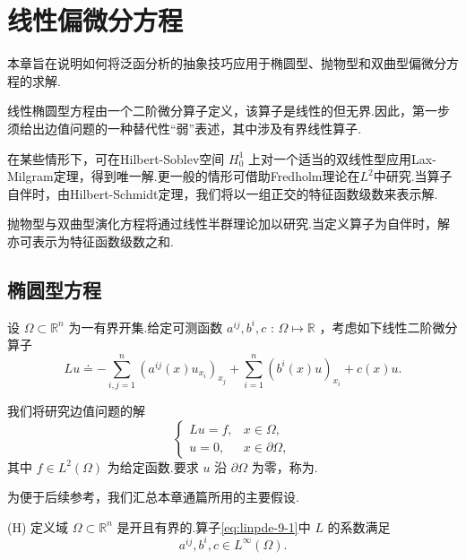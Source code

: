 \chapter{线性偏微分方程}


\vspace{-2em}
本章旨在说明如何将泛函分析的抽象技巧应用于椭圆型、抛物型和双曲型偏微分方程的求解.

线性椭圆型方程由一个二阶微分算子定义，该算子是线性的但无界.因此，第一步须给出边值问题的一种替代性“弱”表述，其中涉及有界线性算子.

在某些情形下，可在Hilbert-Soblev空间 ${H}_{0}^{1}$ 上对一个适当的双线性型应用Lax-Milgram定理，得到唯一解.更一般的情形可借助Fredholm理论在${L}^{2}$中研究.当算子自伴时，由Hilbert-Schmidt定理，我们将以一组正交的特征函数级数来表示解.

抛物型与双曲型演化方程将通过线性半群理论加以研究.当定义算子为自伴时，解亦可表示为特征函数级数之和.

\section{椭圆型方程}

设 $\Omega  \subset  {\mathbb{R}}^{n}$ 为一有界开集.给定可测函数 ${a}^{ij},{b}^{i},c$ : $\Omega  \mapsto  \mathbb{R}$ ，考虑如下线性二阶微分算子
\begin{equation}\tag{9.1}\label{eq:linpde-9-1}
{Lu} \doteq   - \sum_{{i,j = 1}}^{n}{\left( {a}^{ij}\left( x\right) {u}_{{x}_{i}}\right) }_{{x}_{j}} + \sum_{{i = 1}}^{n}{\left( {b}^{i}\left( x\right) u\right) }_{{x}_{i}} + c\left( x\right) u.
\end{equation}

我们将研究边值问题的解
\begin{equation}\tag{9.2}\label{eq:linpde-9-2}
\begin{cases} {Lu}  = f, & x \in  \Omega , \\  u  = 0, & x \in  \partial \Omega , \end{cases}
\end{equation}
其中 $f \in  {L}^{2}\left( \Omega \right)$ 为给定函数.要求 $u$ 沿 $\partial \Omega$ 为零，称为.

为便于后续参考，我们汇总本章通篇所用的主要假设.

(H) 定义域 $\Omega  \subset  {\mathbb{R}}^{n}$ 是开且有界的.算子\eqref{eq:linpde-9-1}中 $L$ 的系数满足
\begin{equation}\tag{9.3}\label{eq:linpde-9-3}
{a}^{ij},{b}^{i},c \in  {L}^{\infty }\left( \Omega \right) .
\end{equation}

